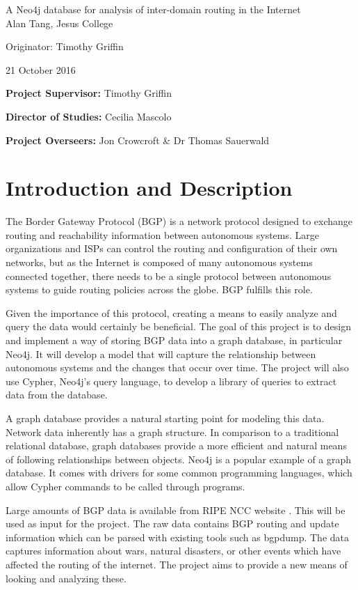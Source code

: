 \documentclass[12pt,a4paper,twoside]{article}
\begin{document}
\begin{center}
\Large
A Neo4j database for analysis of inter-domain routing in the Internet\\[4mm]

\large
Alan Tang, Jesus College

Originator: Timothy Griffin

21 October 2016
\end{center}

\vspace{5mm}

\textbf{Project Supervisor:} Timothy Griffin

\textbf{Director of Studies:} Cecilia Mascolo

\textbf{Project Overseers:} Jon Crowcroft  \& Dr Thomas Sauerwald
\section*{Introduction and Description}

The Border Gateway Protocol (BGP) is a network protocol designed to exchange routing and reachability information between autonomous systems. Large organizations and ISPs can control the routing and configuration of their own networks, but as the Internet is composed of many autonomous systems connected together, there needs to be a single protocol between autonomous systems to guide routing policies across the globe. BGP fulfills this role.

Given the importance of this protocol, creating a means to easily analyze and query the data would certainly be beneficial. The goal of this project is to design and implement a way of storing BGP data into a graph database, in particular Neo4j. It will develop a model that will capture the relationship between autonomous systems and the changes that occur over time. The project will also use Cypher, Neo4j's query language, to develop a library of queries to extract data from the database.

A graph database provides a natural starting point for modeling this data. Network data inherently has a graph structure. In comparison to a traditional relational database, graph databases provide a more efficient and natural means of following relationships between objects. Neo4j is a popular example of a graph database. It comes with drivers for some common programming languages, which allow Cypher commands to be called through programs.

Large amounts of BGP data is available from RIPE NCC website \cite{riperis}. This will be used as input for the project. The raw data contains BGP routing and update information which can be parsed with existing tools such as bgpdump. The data captures information about wars, natural disasters, or other events which have affected the routing of the internet. The project aims to provide a new means of looking and analyzing these. 
\end{document}
